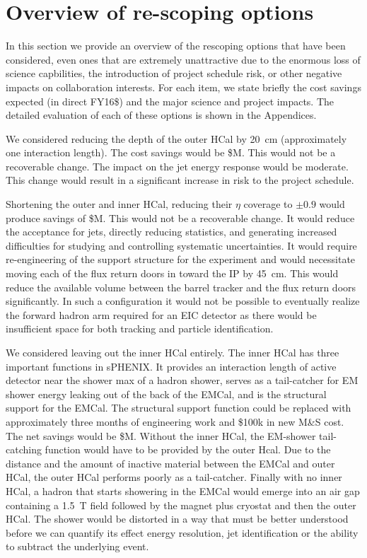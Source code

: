 
\section{Overview of re-scoping options}
\label{sec:overview-re-scoping}

In this section we provide an overview of the rescoping options that
have been considered, even ones that are extremely unattractive due to
the enormous loss of science capbilities, the introduction of project
schedule risk, or other negative impacts on collaboration interests.
For each item, we state briefly the cost savings expected (in direct
FY16\$) and the major science and project impacts.  The detailed
evaluation of each of these options is shown in the Appendices.

We considered reducing the depth of the outer HCal by 20~cm
(approximately one interaction length).  The cost savings would be
\${\thinnedOuterHCal}M.  This would not be a recoverable change. The
impact on the jet energy response would be moderate.  This change
would result in a significant increase in risk to the project
schedule.

Shortening the outer and inner HCal, reducing their $\eta$ coverage to
$\pm0.9$ would produce savings of \${\shortenedHCal}M.  This would not be a
recoverable change.  It would reduce the acceptance for jets, directly
reducing statistics, and generating increased difficulties for
studying and controlling systematic uncertainties.  It would require
re-engineering of the support structure for the experiment and would
necessitate moving each of the flux return doors in toward the IP by
45~cm.  This would reduce the available volume between the barrel tracker 
and the flux return doors significantly. In such a configuration it 
would not be possible to eventually realize the forward hadron arm 
required for an EIC detector as there would be insufficient space for 
both tracking and particle identification.

We considered leaving out the inner HCal entirely.  The inner HCal has
three important functions in sPHENIX.  It provides an interaction
length of active detector near the shower max of a hadron shower,
serves as a tail-catcher for EM shower energy leaking out of the back
of the EMCal, and is the structural support for the EMCal.  The
structural support function could be replaced with approximately three
months of engineering work and \$100k in new M\&S cost.  The net
savings would be \${\noInnerHCal}M.  Without the inner HCal, the
EM-shower tail-catching function would have to be provided by the
outer Hcal.  Due to the distance and the amount of inactive material
between the EMCal and outer HCal, the outer HCal performs poorly as a
tail-catcher.  Finally with no inner HCal, a hadron that starts
showering in the EMCal would emerge into an air gap containing a 1.5~T
field followed by the magnet plus cryostat and then the outer HCal.
The shower would be distorted in a way that must be better understood
before we can quantify its effect energy resolution, jet
identification or the ability to subtract the underlying event.

